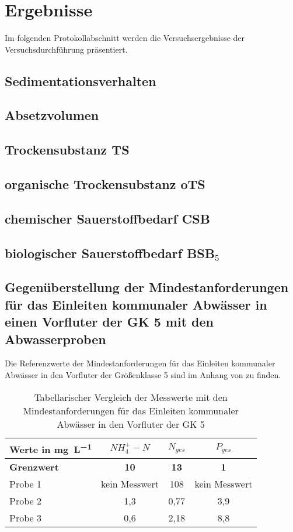 \chapter{Ergebnisse}
\label{sec:ergebnisse}

Im folgenden Protokollabschnitt werden die Versuchsergebnisse der Versuchsdurchführung präsentiert.
\vspace*{-3.5mm}

\section{Sedimentationsverhalten}
\section{Absetzvolumen}
\section{Trockensubstanz TS}
\section{organische Trockensubstanz oTS}
\section{chemischer Sauerstoffbedarf CSB}
\section{biologischer Sauerstoffbedarf BSB$_5$}

\newpage

\section{Gegenüberstellung der Mindestanforderungen für das Einleiten kommunaler Abwässer in einen Vorfluter der GK 5 mit den Abwasserproben}
Die Referenzwerte der Mindestanforderungen für das Einleiten kommunaler Abwässer in den Vorfluter der Größenklasse 5 sind im Anhang von \cite[S. 29]{Skript} zu finden.
\vspace*{-2.5mm}
\renewcommand{\arraystretch}{1.2}
\begin{table}[h!]
	\centering
	\caption{Tabellarischer Vergleich der Messwerte mit den Mindestanforderungen für das Einleiten kommunaler Abwässer in den Vorfluter der GK 5}
	\label{tab_vgl}
	\begin{tabulary}{1.2\textwidth}{l|C|C|C}
		\hline
		Werte in \si{\milli\gram\per\liter} & \textbf{$NH_4^+-N$} & \textbf{$N_{ges}$}&\textbf{$P_{ges}$}\\
		\hline
		\textbf{Grenzwert} & \textbf{10} & \textbf{13} & \textbf{1} \\
		\hline
		Probe 1 & {\footnotesize kein Messwert\protect\footnotemark[5]} & 108 & {\footnotesize kein Messwert\protect\footnotemark[5]} \\
		Probe 2 & 1,3 & 0,77 & 3,9 \\
		Probe 3 & 0,6 & 2,18 & 8,8 \\
		\hline
	\end{tabulary}
\end{table}
\FloatBarrier

